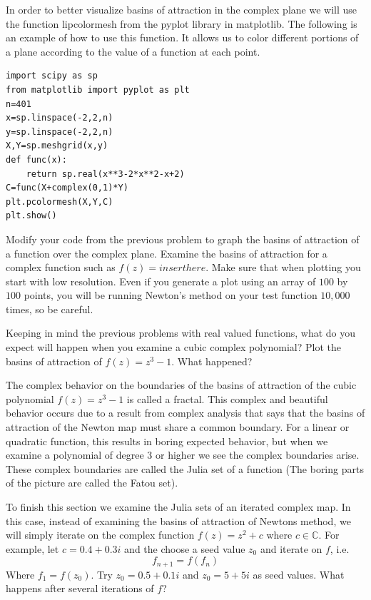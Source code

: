 
In order to better visualize basins of attraction in the complex plane we will use the function li{pcolormesh} from the pyplot library in matplotlib. The following is an example of how to use this function. It allows us to color different portions of a plane according to the value of a function at each point.

\begin{lstlisting}
import scipy as sp
from matplotlib import pyplot as plt
n=401
x=sp.linspace(-2,2,n)
y=sp.linspace(-2,2,n)
X,Y=sp.meshgrid(x,y)
def func(x):
    return sp.real(x**3-2*x**2-x+2)
C=func(X+complex(0,1)*Y)
plt.pcolormesh(X,Y,C)
plt.show()
\end{lstlisting}

\begin{problem}
Modify your code from the previous problem to graph the basins of attraction of a function over the complex plane.  Examine the basins of attraction for a complex function such as $f(z) = insert here$. Make sure that when plotting you start with low resolution. Even if you generate a plot using an array of $100$ by $100$ points, you will be running Newton's method on your test function $10,000$ times, so be careful.  

Keeping in mind the previous problems with real valued functions, what do you expect will happen when you examine a cubic complex polynomial?  Plot the basins of attraction of $f(z) = z^3 - 1$.  What happened?
\end{problem}

The complex behavior on the boundaries of the basins of attraction of the cubic polynomial $f(z) = z^3 - 1$ is called a fractal.  This complex and beautiful behavior occurs due to a result from complex analysis that says that the basins of attraction of the Newton map must share a common boundary.  For a linear or quadratic function, this results in boring expected behavior, but when we examine a polynomial of degree 3 or higher we see the complex boundaries arise.  These complex boundaries are called the Julia set of a function (The boring parts of the picture are called the Fatou set).  

To finish this section we examine the Julia sets of an iterated complex map.  In this case, instead of examining the basins of attraction of Newtons method, we will simply iterate on the complex function $f(z) = z^2 + c$ where $c \in \mathbb{C}$.  For example, let $c = 0.4 + 0.3i$ and the choose a seed value $z_0$ and iterate on $f$, i.e.
\[
f_{n+1} = f(f_n)
\]
Where $f_1 = f(z_0)$.  Try $z_0 = 0.5 + 0.1i$ and $z_0 = 5 + 5i$ as seed values.  What happens after several iterations of $f$?

